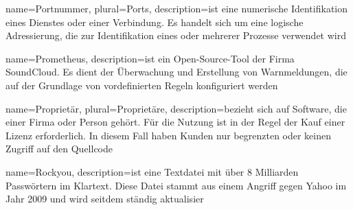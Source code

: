  {
    name={Portnummer},
    plural={Ports},
    description={ist eine numerische Identifikation eines Dienstes oder einer Verbindung. Es handelt sich um eine logische Adressierung, die zur Identifikation eines oder mehrerer Prozesse verwendet wird \citep{Tanenbaum_CN}}}

 {
    name={Prometheus},
    description={ist ein Open-Source-Tool der Firma SoundCloud. Es dient der Überwachung und Erstellung von Warnmeldungen, die auf der Grundlage von vordefinierten Regeln konfiguriert werden \citep{Prometheus_doc}}}

 {
    name={Proprietär},
    plural={Proprietäre},
    description={bezieht sich auf Software, die einer Firma oder Person gehört. Für die Nutzung ist in der Regel der Kauf einer Lizenz erforderlich. In diesem Fall haben Kunden nur begrenzten oder keinen Zugriff auf den Quellcode \citep{Nexcess_P}}}



 {
    name={Rockyou},
    description={ist eine Textdatei mit über 8 Milliarden Passwörtern im Klartext. Diese Datei stammt aus einem Angriff gegen Yahoo im Jahr 2009 und wird seitdem ständig aktualisier \citep{Mikalauskas_rockyou}}}




